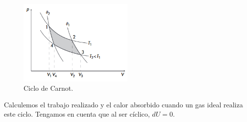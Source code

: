 \documentclass[openany]{book}
\begin{document}
\begin{figure}[hbt!]
	\centering
	\includegraphics[width=0.5\textwidth]{img/ciclo-carnot.png}
	\caption{Ciclo de Carnot.}
	\label{fig:ciclo-carnot}
\end{figure}

\par Calculemos el trabajo realizado y el calor absorbido cuando un gas ideal realiza este ciclo. Tengamos en cuenta que al ser cíclico, $dU=0$.
\end{document}
